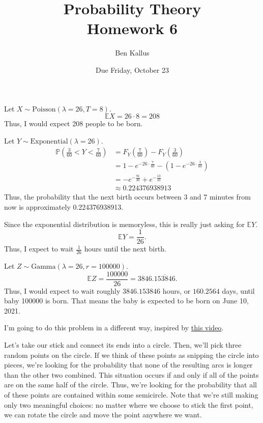 \documentclass[12pt]{article}
\title{Probability Theory \\ Homework 6}
\author{Ben Kallus}
\date{Due Friday, October 23}
\begin{document}
\maketitle


 Let $X \sim \text{Poisson}(\lambda=26, T=8)$. $$\mathbb EX = 26 \cdot 8 = 208$$ Thus, I would expect 208 people to be born.

\medskip
{} Let $Y \sim \text{Exponential}(\lambda=26)$.
\begin{align*}
    \mathbb P\left(\frac3{60} < Y < \frac7{60}\right) &= F_Y\left(\frac7{60}\right) - F_Y\left(\frac3{60}\right) \\
                                                      &= 1 - e^{-26\cdot \frac7{60}} - (1 - e^{-26\cdot \frac3{60}}) \\
                                                      &= -e^{-\frac{91}{30}}+e^{-\frac{13}{10}} \\
                                                      &\approx 0.224376938913
\end{align*}
Thus, the probability that the next birth occurs between 3 and 7 minutes from now is approximately 0.224376938913.

\medskip
{} Since the exponential distribution is memoryless, this is really just asking for $\mathbb EY$. $$\mathbb EY = \frac1{26}.$$ Thus, I expect to wait $\frac1{26}$ hours until the next birth.
    
\medskip
{} Let $Z \sim \text{Gamma}(\lambda=26, r=100000)$. $$\mathbb EZ = \frac{100000}{26} = 3846.\overline{153846}.$$ Thus, I would expect to wait roughly $3846.153846$ hours, or $160.2564$ days, until baby 100000 is born. That means the baby is expected to be born on June 10, 2021.

\newpage
{} I'm going to do this problem in a different way, inspired by \href{https://www.youtube.com/watch?v=OkmNXy7er84}{this video}.

Let's take our stick and connect its ends into a circle. Then, we'll pick three random points on the circle. If we think of these points as snipping the circle into pieces, we're looking for the probability that none of the resulting arcs is longer than the other two combined. This situation occurs if and only if all of the points are on the same half of the circle. Thus, we're looking for the probability that all of these points are contained within some semicircle. Note that we're still making only two meaningful choices: no matter where we choose to stick the first point, we can rotate the circle and move the point anywhere we want.
\end{document}
